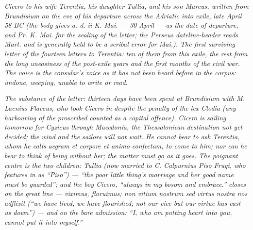 
\textit{Cicero to his wife Terentia, his daughter Tullia, and
his son Marcus, written from Brundisium on the eve of his
departure across the Adriatic into exile, late April 58 BC
(the body gives \textit{a. d. ii K. Mai.} ---  30 April --- as
the date of departure, and \textit{Pr. K. Mai.} for the
sealing of the letter; the Perseus dateline-header reads
\textit{Mart.} and is generally held to be a scribal error
for \textit{Mai.}). The first surviving letter of the
fourteen letters to Terentia: ten of them from this exile,
the rest from the long uneasiness of the post-exile years and
the first months of the civil war. The voice is the consular's
voice as it has not been heard before in the corpus: undone,
weeping, unable to write or read.}

\textit{The substance of the letter: thirteen days have been
spent at Brundisium with M. Laenius Flaccus, who took Cicero
in despite the penalty of the lex Clodia (any harbouring of
the proscribed counted as a capital offence). Cicero is
sailing tomorrow for Cyzicus through Macedonia, the
Thessalonican destination not yet decided; the wind and the
sailors will not wait. He cannot bear to ask Terentia, whom
he calls \textit{aegram et corpore et animo confectam}, to
come to him; nor can he bear to think of being without her;
the matter must go as it goes. The poignant centre is the
two children: Tullia (now married to C. Calpurnius Piso
Frugi, who features in  as ``Piso'') ---
``the poor little thing's marriage and her good name must be
guarded''; and the boy Cicero, ``always in my bosom and
embrace.''  closes on the great line ---
\textit{viximus, floruimus; non vitium nostrum sed virtus
nostra nos adflixit} (``we have lived, we have flourished;
not our vice but our virtue has cast us down'') --- and on
the bare admission: ``I, who am putting heart into you,
cannot put it into myself.''}
